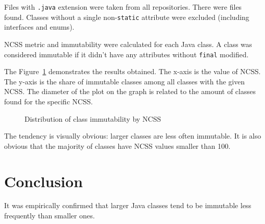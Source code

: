 \documentclass[12pt]{article}
\begin{document}
Files with \texttt{.java} extension were taken from all repositories.
There were \totaljavafiles{} files found. Classes without a single
non-\texttt{static} attribute were excluded (including interfaces and enums).

NCSS metric and immutability were calculated for each Java class.
A class was considered immutable if it didn't have any
attributes without \texttt{final} modified.

The Figure~\ref{fig:1} demonstrates the results obtained. The x-axis is
the value of NCSS. The y-axis is the share of immutable classes among
all classes with the given NCSS. The diameter of the plot on the graph
is related to the amount of classes found for the specific NCSS.

\begin{figure}[h]
  
  \caption{Distribution of class immutability by NCSS}
  \label{fig:1}
\end{figure}

The tendency is visually obvious: larger classes are less often immutable. It
is also obvious that the majority of classes have NCSS values smaller than 100.

\section{Conclusion}

It was empirically confirmed that larger Java classes tend to be immutable
less frequently than smaller ones.
\end{document}
